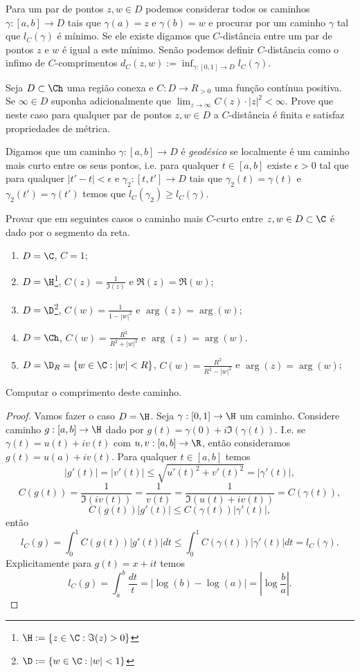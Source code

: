 Para um par de pontos $z,w \in D$ podemos considerar todos os caminhos $\gamma : [a,b] \to D$
tais que $\gamma(a) = z$ e $\gamma(b) = w$ e procurar por um caminho $\gamma$ 
tal que $l_C(\gamma)$ é mínimo. Se ele existe digamos que $C$-distância entre um par de pontos $z$ e $w$
é igual a este mínimo. Senão podemos definir $C$-distância como o infimo de $C$-comprimentos
$d_C(z,w) := \inf_{\gamma: [0,1] \to D} l_C(\gamma)$.

\begin{problema}
Seja $D\subset\Ch$ uma região conexa e $C : D \to R_{>0}$ uma função contínua positiva.
Se $\infty \in D$ suponha adicionalmente que $\lim_{z\to\infty} C(z) \cdot |z|^2 < \infty$.
Prove que neste caso para qualquer par de pontos $z,w \in D$ a $C$-distância é finita e satisfaz propriedades de métrica.
\end{problema}

\begin{defin}[Geodésicas]
Digamos que um caminho $\gamma: [a,b] \to D$ é \emph{geodésico} se localmente é um caminho mais curto entre os seus pontos,
i.e. para qualquer $t\in [a,b]$ existe $\epsilon>0$ tal que para qualquer $|t'-t|<\epsilon$ e $\gamma_2: [t,t'] \to D$
tais que $\gamma_2(t) = \gamma(t)$ e $\gamma_2(t') = \gamma(t')$ temos que
$l_C(\gamma_2) \geq l_C(\gamma)$. 
\end{defin}


\begin{problema}
Provar que em seguintes casos o caminho mais $C$-curto entre $z,w\in D \subset \C$
é dado por o segmento da reta.
\begin{enumerate}
\item $D = \C$, $C=1$;
\item $D = \H$\footnote{$\H := \{z\in\C: \Im(z)>0\}$}, $C(z) = \frac{1}{\Im(z)}$ e $\Re(z) = \Re(w)$;
\item $D = \D$\footnote{$\D := \{w\in\C: |w|<1\}$},    $C(w) = \frac{1}{1-|w|^2}$ e $\arg(z) = \arg(w)$;
\item $D = \Ch$, $C(w) = \frac{R^2}{R^2+|w|^2}$ e $\arg(z) = \arg(w)$.
\item $D = \D_R = \{w\in\C: |w|<R\}$, $C(w) = \frac{R^2}{R^2-|w|^2}$ e $\arg(z) = \arg(w)$;
\end{enumerate}
Computar o comprimento deste caminho.
\end{problema}
\begin{proof}
Vamos fazer o caso $D=\H$.
Seja $\gamma : [0,1] \to \H$ um caminho.
Considere caminho $g: [a,b] \to \H$ dado por $g(t) = \gamma(0) + i \Im(\gamma(t))$.
I.e. se $\gamma(t) = u(t) + i v(t)$ com $u,v: [a,b] \to \R$, então consideramos $g(t) = u(a) + i v(t)$.
Para qualquer $t\in [a,b]$ temos
\[ |g'(t)| = |v'(t)| \leq \sqrt{u'(t)^2 + v'(t)^2} = |\gamma'(t)|, \]
\[ C(g(t)) = \frac{1}{\Im(iv(t))} = \frac{1}{v(t)} = \frac{1}{\Im(u(t)+iv(t))} = C(\gamma(t)), \]
\[ C(g(t)) |g'(t)| \leq C(\gamma(t)) |\gamma'(t)|, \]
então
\[ l_C(g) = \int_0^1 C(g(t)) |g'(t)| dt \leq \int_0^1 C(\gamma(t)) |\gamma'(t)| dt = l_C(\gamma). \]
Explicitamente para $g(t) = x + i t$ temos
\[ l_C(g) = \int_a^b \frac{dt}{t} = |\log(b) - \log(a)| = |\log\frac{b}{a}| . \]
\end{proof}




